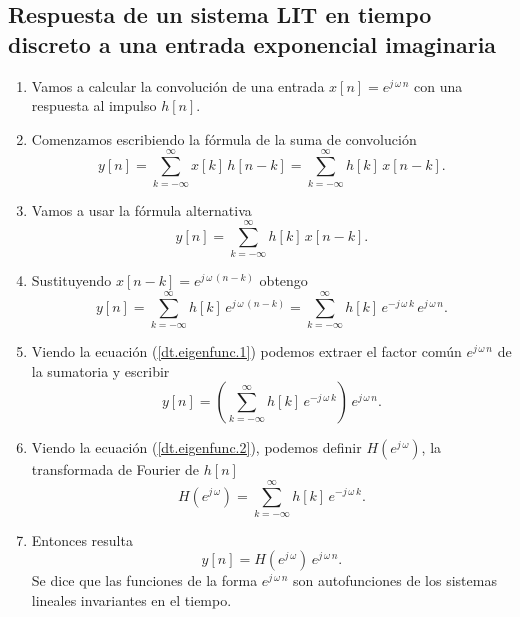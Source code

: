 \subsection{Respuesta de un sistema LIT en tiempo discreto a una entrada exponencial imaginaria}

\begin{enumerate}
	\item Vamos a calcular la convolución de una entrada $x[n] = e^{j \, \omega \, n}$ con una respuesta al impulso $h[n]$. 
	
	\item Comenzamos escribiendo la fórmula de la suma de convolución
	\begin{equation}
		y\left[ n\right] =
		\sum_{k=-\infty }^{\infty }x\left[ k\right] \, h\left[ n-k\right] =
		\sum_{k=-\infty }^{\infty }h\left[ k\right] \, x\left[ n-k\right].
	\end{equation}

    \item Vamos a usar la fórmula alternativa
	\begin{equation}
	y\left[ n\right] =
	\sum_{k=-\infty }^{\infty }h\left[ k\right] \, x\left[ n-k\right].
    \end{equation}

    \item Sustituyendo $x[n - k] =  e^{j \, \omega \, (n-k)}$ obtengo
     \begin{equation}
	    y\left[ n\right] =
	    \sum_{k=-\infty }^{\infty }h\left[ k\right] \, e^{j \, \omega \, (n-k)} =
	    \sum_{k=-\infty }^{\infty }h\left[ k\right] \, e^{-j \, \omega \, k} \, e^{j \, \omega \, n}. \label{dt.eigenfunc.1}
     \end{equation}
   
     \item Viendo la ecuación (\ref{dt.eigenfunc.1}) podemos extraer el factor común $e^{j \, \omega \, n}$ de la sumatoria y escribir
     \begin{equation}
	y\left[ n\right] =
	\left(\sum_{k=-\infty }^{\infty }h\left[ k\right] \, e^{-j \, \omega \, k}\right) \, e^{j \, \omega \, n}. \label{dt.eigenfunc.2}
    \end{equation}

    \item Viendo la ecuación (\ref{dt.eigenfunc.2}), podemos definir $H(e^{j \, \omega})$, la transformada de Fourier de $h[n]$
    \begin{equation}
	H(e^{j \, \omega}) =
	\sum_{k=-\infty }^{\infty }h\left[ k\right] \, e^{-j \, \omega \, k}. \label{dt.eigenfunc.3}
    \end{equation}	 

    \item Entonces resulta
    \begin{equation}
    	y[n] = H(e^{j \, \omega}) \, e^{j \, \omega \, n}.
    \end{equation}
    Se dice que las funciones de la forma $e^{j \, \omega \, n}$ son autofunciones de los sistemas lineales invariantes en el tiempo.
\end{enumerate}  

